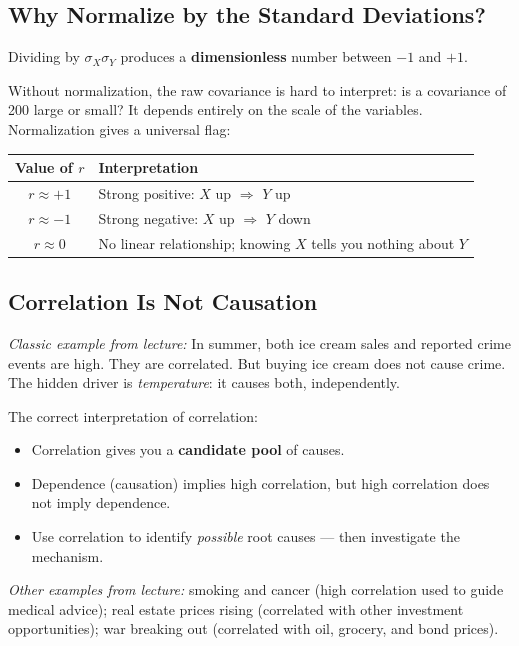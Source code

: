 \documentclass[11pt]{article}
\begin{document}
\subsection{Why Normalize by the Standard Deviations?}
Dividing by $\sigma_X \sigma_Y$ produces a \textbf{dimensionless} number between
$-1$ and $+1$.

Without normalization, the raw covariance is hard to interpret: is a covariance of
200 large or small? It depends entirely on the scale of the variables.
Normalization gives a universal flag:

\begin{center}
\begin{tabular}{@{}cl@{}}
\toprule
\textbf{Value of $r$} & \textbf{Interpretation} \\
\midrule
$r \approx +1$        & Strong positive: $X$ up $\Rightarrow$ $Y$ up \\
$r \approx -1$        & Strong negative: $X$ up $\Rightarrow$ $Y$ down \\
$r \approx 0$         & No linear relationship; knowing $X$ tells you nothing about $Y$ \\
\bottomrule
\end{tabular}
\end{center}

\subsection{Correlation Is Not Causation}
\textit{Classic example from lecture:} In summer, both ice cream sales and reported
crime events are high. They are correlated. But buying ice cream does not cause
crime. The hidden driver is \emph{temperature}: it causes both, independently.

The correct interpretation of correlation:
\begin{itemize}
    \item Correlation gives you a \textbf{candidate pool} of causes.
    \item Dependence (causation) implies high correlation, but high correlation
      does not imply dependence.
    \item Use correlation to identify \emph{possible} root causes --- then
      investigate the mechanism.
\end{itemize}

\textit{Other examples from lecture:} smoking and cancer (high correlation used
to guide medical advice); real estate prices rising (correlated with other
investment opportunities); war breaking out (correlated with oil, grocery, and
bond prices).
\end{document}

